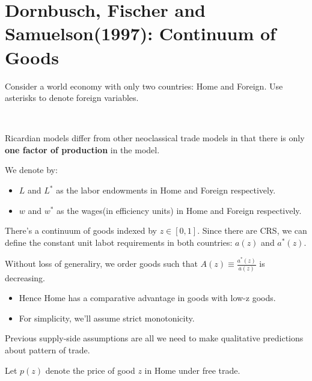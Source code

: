 \section{Dornbusch, Fischer and Samuelson(1997): Continuum of Goods\cite{dornbusch1977comparative}}

Consider a world economy with only two countries: Home and Foreign.
Use asterisks to denote foreign variables. 
\begin{note}
    \

    Ricardian models diﬀer from other neoclassical trade models in that
    there is only \textbf{one factor of production} in the model.
\end{note}

We denote by:
\begin{itemize}
    \item $L$ and $L^*$ as the labor endowments in Home and Foreign respectively.
    \item $w$ and $w^*$ as the wages(in efficiency units) in Home and Foreign respectively.
\end{itemize}

There's a continuum of goods indexed by $z \in [0,1]$.
Since there are CRS, we can define the constant unit labot requirements in both countries: $a(z)$ and $a^*(z)$.

Without loss of generaliry, we order goods such that $A(z) \equiv \frac{a^*(z)}{a(z)}$ is decreasing.
\begin{itemize}
    \item Hence Home has a comparative advantage in goods with low-z goods.
    \item For simplicity, we'll assume strict monotonicity.
\end{itemize}

Previous supply-side assumptions are all we need to make qualitative
predictions about pattern of trade.

Let $p(z)$ denote the price of good $z$ in Home under free trade.

